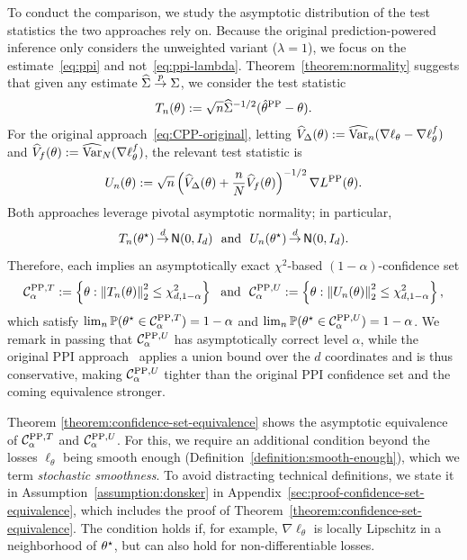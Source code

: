 To conduct the comparison, we study the asymptotic distribution of the test
statistics the two approaches rely on. Because the original
prediction-powered inference only considers the unweighted variant ($\lambda
= 1$), we focus on the estimate~\eqref{eq:ppi} and not~\eqref{eq:ppi-lambda}.
Theorem~\ref{theorem:normality} suggests that
given any estimate $\widehat{\Sigma} \stackrel{p}{\rightarrow} \Sigma$, we consider the
test statistic
\begin{equation*}
  T_n(\theta) := \sqrt{n} \widehat{\Sigma}^{-1/2} (\hat{\theta}^{\mathrm{PP}} - \theta).
\end{equation*}
For the original approach~\eqref{eq:CPP-original}, letting
$\widehat{V}_\Delta(\theta) := \widehat{\mathrm{Var}}_n(\nabla \ell_{\theta} - \nabla
\ell_{\theta}^f)$ and $\widehat{V}_f(\theta) := \widehat{\mathrm{Var}}_{N} (\nabla
\ell_{\theta}^f)$, the relevant test statistic is
\begin{equation*}
  U_n(\theta) := \sqrt{n} \left(\widehat{V}_\Delta(\theta) + \frac n N \widehat{V}_f (\theta) \right)^{-1/2}
  \nabla L^{\mathrm{PP}}(\theta).
\end{equation*}
Both approaches leverage pivotal asymptotic normality; in particular,
\begin{equation*}
  T_n(\theta^\star) \mathop{\stackrel{d}{\rightarrow}} \mathsf{N}(0, I_d)
  ~~ \mbox{and} ~~
  U_n(\theta^\star) \mathop{\stackrel{d}{\rightarrow}} \mathsf{N}(0, I_d).
\end{equation*}
Therefore, each implies an asymptotically exact $\chi^2$-based
$(1 - \alpha)$-confidence set
\begin{equation*}
\mathcal{C}_\alpha^{\mathrm{PP},T} := \left\{\theta : \left\|{T_n(\theta)}\right\|_2^2
  \le \chi^2_{d,1-\alpha}\right\}
  ~~ \mbox{and} ~~
\mathcal{C}_\alpha^{\mathrm{PP},U} := \left\{\theta : \left\|{U_n(\theta)}\right\|_2^2 \le \chi^2_{d,1-\alpha}
  \right\},
\end{equation*}
which satisfy $\lim_n \mathbb{P}(\theta^\star \in \mathcal{C}_\alpha^{\textup{PP},T}) = 1 -
\alpha$ and $\lim_n \mathbb{P}(\theta^\star \in \mathcal{C}_\alpha^{\textup{PP},U}) = 1 -
\alpha$. We remark in passing that $\mathcal{C}_\alpha^{\textup{PP},U}$ has
asymptotically correct level $\alpha$, while the original PPI
approach~\cite[Thm.~B.1]{AngelopoulosBaFaJoZr23} applies a union bound over
the $d$ coordinates and is thus conservative, making $\mathcal{C}_\alpha^{\textup{PP},U}$
tighter than the original PPI confidence set and the coming
equivalence stronger.

Theorem \ref{theorem:confidence-set-equivalence} shows the asymptotic
equivalence of $\mathcal{C}_\alpha^{\textup{PP},T}$ and
$\mathcal{C}_\alpha^{\textup{PP},U}$. For this, we require an additional condition
beyond the losses $\ell_\theta$ being smooth enough
(Definition~\ref{definition:smooth-enough}), which we term \emph{stochastic
smoothness}. To avoid distracting technical definitions, we state it in
Assumption~\ref{assumption:donsker} in
Appendix~\ref{sec:proof-confidence-set-equivalence}, which includes the
proof of Theorem~\ref{theorem:confidence-set-equivalence}. The condition
holds if, for example, $\nabla \ell_{\theta}$ is locally Lipschitz in a
neighborhood of $\theta^\star$, but can also hold for non-differentiable
losses.

